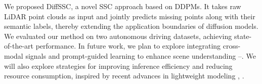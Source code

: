 \documentclass[conference]{IEEEtran}
\begin{document}
We proposed DiffSSC, a novel SSC approach based on DDPMs.
It takes raw LiDAR point clouds as input and jointly predicts missing points along with their semantic labels, thereby extending the application boundaries of diffusion models.
We evaluated our method on two autonomous driving datasets, achieving state-of-the-art performance.
In future work, we plan to explore integrating cross-modal signals and prompt-guided learning to enhance scene understanding \cite{wwu}--\cite{wwu2025}.
We will also explore strategies for improving inference efficiency and reducing resource consumption, inspired by recent advances in lightweight modeling \cite{yli}, \cite{ylia}.



\end{document}
